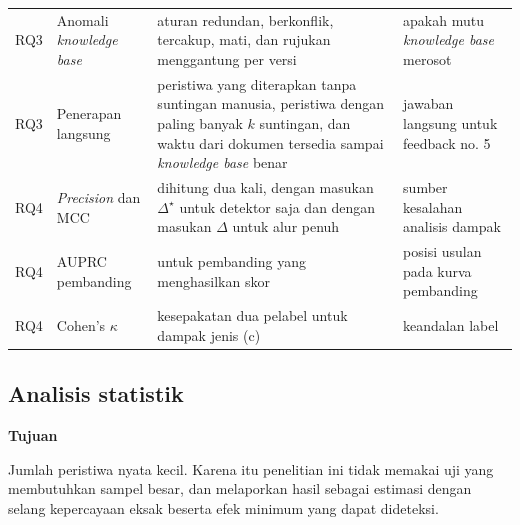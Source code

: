 \documentclass[journal,a4paper]{IEEEtran}
\newcommand{\en}[1]{\textit{#1}}
\newcommand{\emas}{\star}
\newif\ifrancangan \rancangantrue
\newcommand{\kotak}[3]{\ifrancangan\par\begingroup\scriptsize
  \def\FrameCommand{\fboxsep=3pt\fboxrule=0.4pt\fcolorbox{#1!60!black}{#1!6}}%
  \MakeFramed{\advance\hsize-\width\FrameRestore}\noindent\textbf{#2}\par #3\endMakeFramed\endgroup\fi}
\newcommand{\tujuan}[1]{\kotak{blue}{Tujuan}{#1}}
\begin{document}
\begin{table}[t]
\begin{tabularx}{\textwidth}{@{}P{1.2cm} P{3.4cm} L P{3.4cm}@{}}
RQ3 & Anomali \en{knowledge base} & aturan redundan, berkonflik, tercakup, mati, dan rujukan menggantung per versi & apakah mutu \en{knowledge base} merosot \\
RQ3 & Penerapan langsung & peristiwa yang diterapkan tanpa suntingan manusia, peristiwa dengan paling banyak $k$ suntingan, dan waktu dari dokumen tersedia sampai \en{knowledge base} benar & jawaban langsung untuk feedback no. 5 \\
\midrule
RQ4 & \en{Precision} dan MCC & dihitung dua kali, dengan masukan $\Delta^{\emas}$ untuk detektor saja dan dengan masukan $\hat{\Delta}$ untuk alur penuh & sumber kesalahan analisis dampak \\
RQ4 & AUPRC pembanding & untuk pembanding yang menghasilkan skor & posisi usulan pada kurva pembanding \\
RQ4 & Cohen's $\kappa$ & kesepakatan dua pelabel untuk dampak jenis (c) & keandalan label \\
\bottomrule
\end{tabularx}
\end{table}

\subsection{Analisis statistik}
\label{subsec:statistik}
\tujuan{Jumlah peristiwa nyata kecil. Karena itu penelitian ini tidak memakai uji yang membutuhkan sampel besar, dan melaporkan hasil sebagai estimasi dengan selang kepercayaan eksak beserta efek minimum yang dapat dideteksi.}
\end{document}
